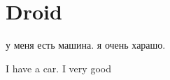 \documentclass{article}
\begin{document}
\renewcommand{\sfdefault}{fds}\normalfont
\section{Droid}

у меня есть машина. я очень харашо.

I have a car. I very good
\end{document}
